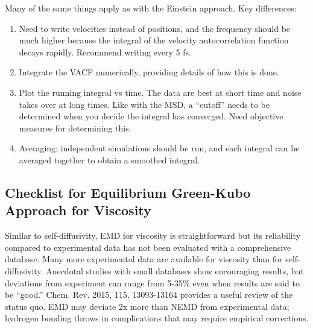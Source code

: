 \documentclass[9pt]{livecoms}
\begin{document}
Many of the same things apply as with the Einstein approach. Key differences:

\begin{enumerate}
	\item Need to write velocities instead of positions, and the frequency should be much higher because the integral of the velocity autocorrelation function decays rapidly. Recommend writing every 5 fs. 
	\item Integrate the VACF numerically, providing details of how this is done.
	\item Plot the running integral vs time. The data are best at short time and noise takes over at long times. Like with the MSD, a “cutoff” needs to be determined when you decide the integral has converged. Need objective measures for determining this.
	\item Averaging: independent simulations should be run, and each integral can be averaged together to obtain a smoothed integral. 
\end{enumerate}

\subsection{Checklist for Equilibrium Green-Kubo Approach for Viscosity}

Similar to self-diffusivity, EMD for viscosity is straightforward but its reliability compared to experimental data has not been evaluated with a comprehensive database. Many more experimental data are available for viscosity than for self-diffusivity. Anecdotal studies with small databases show encouraging results, but deviations from experiment can range from 5-35\% even when results are said to be “good.” Chem. Rev. 2015, 115, 13093-13164 provides a useful review of the status quo. EMD may deviate 2x more than NEMD from experimental data; hydrogen bonding throws in complications that may require empirical corrections. 


\end{document}
